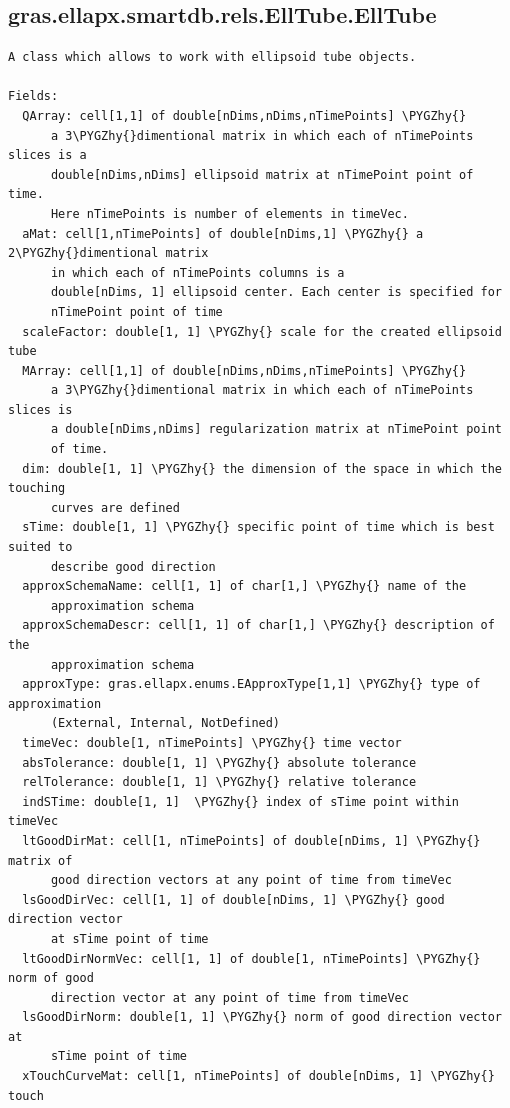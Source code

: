 \documentclass[letterpaper,10pt,english]{sphinxmanual}
\def\PYGZhy{\char`\-}
\begin{document}
\subsection{gras.ellapx.smartdb.rels.EllTube.EllTube}
\label{chap_functions:gras-ellapx-smartdb-rels-elltube-elltube}
\begin{Verbatim}[commandchars=\\\{\}]
A class which allows to work with ellipsoid tube objects.

Fields:
  QArray: cell[1,1] of double[nDims,nDims,nTimePoints] \PYGZhy{}
      a 3\PYGZhy{}dimentional matrix in which each of nTimePoints slices is a
      double[nDims,nDims] ellipsoid matrix at nTimePoint point of time.
      Here nTimePoints is number of elements in timeVec.
  aMat: cell[1,nTimePoints] of double[nDims,1] \PYGZhy{} a 2\PYGZhy{}dimentional matrix
      in which each of nTimePoints columns is a
      double[nDims, 1] ellipsoid center. Each center is specified for
      nTimePoint point of time
  scaleFactor: double[1, 1] \PYGZhy{} scale for the created ellipsoid tube
  MArray: cell[1,1] of double[nDims,nDims,nTimePoints] \PYGZhy{}
      a 3\PYGZhy{}dimentional matrix in which each of nTimePoints slices is
      a double[nDims,nDims] regularization matrix at nTimePoint point
      of time.
  dim: double[1, 1] \PYGZhy{} the dimension of the space in which the touching
      curves are defined
  sTime: double[1, 1] \PYGZhy{} specific point of time which is best suited to
      describe good direction
  approxSchemaName: cell[1, 1] of char[1,] \PYGZhy{} name of the
      approximation schema
  approxSchemaDescr: cell[1, 1] of char[1,] \PYGZhy{} description of the
      approximation schema
  approxType: gras.ellapx.enums.EApproxType[1,1] \PYGZhy{} type of approximation
      (External, Internal, NotDefined)
  timeVec: double[1, nTimePoints] \PYGZhy{} time vector
  absTolerance: double[1, 1] \PYGZhy{} absolute tolerance
  relTolerance: double[1, 1] \PYGZhy{} relative tolerance
  indSTime: double[1, 1]  \PYGZhy{} index of sTime point within timeVec
  ltGoodDirMat: cell[1, nTimePoints] of double[nDims, 1] \PYGZhy{} matrix of
      good direction vectors at any point of time from timeVec
  lsGoodDirVec: cell[1, 1] of double[nDims, 1] \PYGZhy{} good direction vector
      at sTime point of time
  ltGoodDirNormVec: cell[1, 1] of double[1, nTimePoints] \PYGZhy{} norm of good
      direction vector at any point of time from timeVec
  lsGoodDirNorm: double[1, 1] \PYGZhy{} norm of good direction vector at
      sTime point of time
  xTouchCurveMat: cell[1, nTimePoints] of double[nDims, 1] \PYGZhy{} touch

\end{Verbatim}
\end{document}
